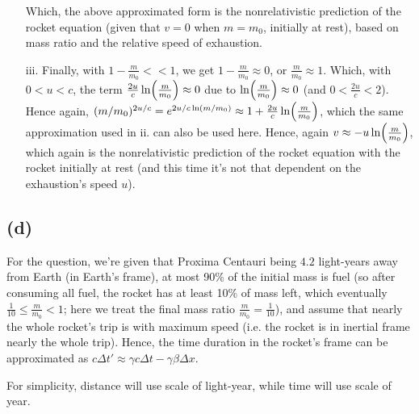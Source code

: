 \documentclass{article}
\DeclarePairedDelimiter{\paran}{(}{)}%
\begin{document}
\begin{itemize}
    Which, the above approximated form is the nonrelativistic prediction of the rocket equation (given that $v=0$ when $m=m_0$, initially at rest), based on mass ratio and the relative speed of exhaustion.

    \item[iii.] Finally, with $1-\frac{m}{m_0}<<1$, we get $1-\frac{m}{m_0}\approx 0$, or $\frac{m}{m_0}\approx 1$. Which, with $0<u<c$, the term $\frac{2u}{c}\ln\paran*{\frac{m}{m_0}}\approx 0$ due to $\ln\paran*{\frac{m}{m_0}}\approx 0$ (and $0<\frac{2u}{c}<2$). Hence again, $(m/m_0)^{2u/c} = e^{2u/c\ln(m/m_0)}\approx 1+\frac{2u}{c}\ln\paran*{\frac{m}{m_0}}$, which the same approximation used in ii. can also be used here. Hence, again $v \approx -u\ln\paran*{\frac{m}{m_0}}$, which again is the nonrelativistic prediction of the rocket equation with the rocket initially at rest (and this time it's not that dependent on the exhaustion's speed $u$).
\end{itemize}

\subsection*{(d)}
For the question, we're given that Proxima Centauri being $4.2$ light-years away from Earth (in Earth's frame), at most 90\% of the initial mass is fuel (so after consuming all fuel, the rocket has at least 10\% of mass left, which eventually $\frac{1}{10}\leq \frac{m}{m_0}<1$; here we treat the final mass ratio $\frac{m}{m_0}=\frac{1}{10}$), and assume that nearly the whole rocket's trip is with maximum speed (i.e. the rocket is in inertial frame nearly the whole trip). Hence, the time duration in the rocket's frame can be approximated as $c\Delta t' \approx \gamma c\Delta t - \gamma\beta \Delta x$.

For simplicity, distance will use scale of light-year, while time will use scale of year.
\end{document}
